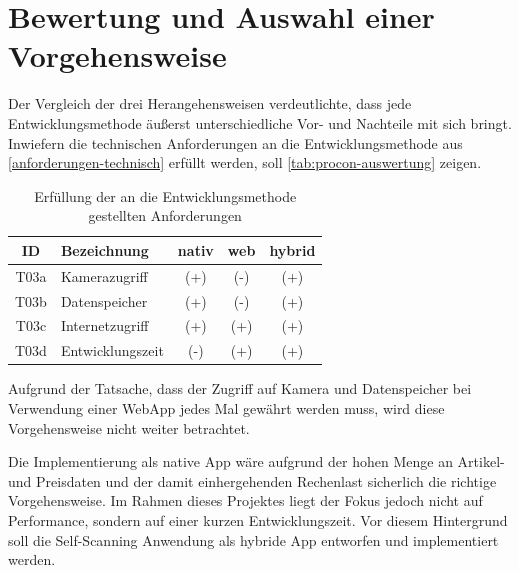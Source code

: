 \section{Bewertung und Auswahl einer Vorgehensweise}
Der Vergleich der drei Herangehensweisen verdeutlichte, dass jede Entwicklungsmethode äußerst unterschiedliche Vor- und Nachteile mit sich bringt. Inwiefern die technischen Anforderungen an die Entwicklungsmethode aus \ref{anforderungen-technisch} erfüllt werden, soll \vref{tab:procon-auswertung} zeigen.

\begin{table}[H]
  \begin{center}\small\renewcommand{\arraystretch}{1.4}\sffamily %
    \begin{tabulary}{\textwidth}{cl*{3}{>{\ttfamily}c}}
    \textbf{ID} & \textbf{Bezeichnung} & \sffamily\textbf{nativ} & \sffamily\textbf{web} & \sffamily\textbf{hybrid}\\ \hline
    
    T03a & Kamerazugriff & (+) & (-) & (+) \\
    T03b & Datenspeicher & (+) & (-) & (+) \\
    T03c & Internetzugriff & (+) & (+) & (+) \\
    T03d & Entwicklungszeit & (-) & (+) & (+)

    \end{tabulary}        
    
    \caption{Erfüllung der an die Entwicklungsmethode gestellten Anforderungen}
    \label{tab:procon-auswertung}
  \end{center}
\end{table}

Aufgrund der Tatsache, dass der Zugriff auf Kamera und Datenspeicher bei Verwendung einer WebApp jedes Mal gewährt werden muss, wird diese Vorgehensweise nicht weiter betrachtet.

Die Implementierung als native App wäre aufgrund der hohen Menge an Artikel- und Preisdaten und der damit einhergehenden Rechenlast sicherlich die richtige Vorgehensweise. Im Rahmen dieses Projektes liegt der Fokus jedoch nicht auf Performance, sondern auf einer kurzen Entwicklungszeit. Vor diesem Hintergrund soll die Self-Scanning Anwendung als hybride App entworfen und implementiert werden.

